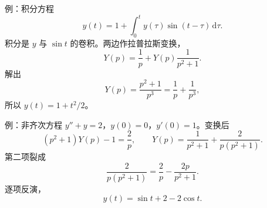 \documentclass[fontset=windows, chinese, 10pt, xcolor=dvipsnames]{beamer}
\begin{document}
\begin{frame}{例：积分方程}
  \begin{equation*}
    y(t)=1+\int_0^t y(\tau)\sin(t-\tau)\,\mathrm{d}\tau.
  \end{equation*}
  积分是 $y$ 与 $\sin t$ 的卷积。两边作拉普拉斯变换，
  \begin{equation*}
    Y(p)=\frac{1}{p}+Y(p)\frac{1}{p^2+1}.
  \end{equation*}
  解出
  \begin{equation*}
    Y(p)=\frac{p^2+1}{p^3}=\frac{1}{p}+\frac{1}{p^3},
  \end{equation*}
  所以 $y(t)=1+t^2/2$。
\end{frame}


\begin{frame}{例：非齐次方程}
  $y''+y=2$，$y(0)=0$，$y'(0)=1$。变换后
  \begin{equation*}
    (p^2+1)Y(p)-1=\frac{2}{p},
    \qquad
    Y(p)=\frac{1}{p^2+1}+\frac{2}{p(p^2+1)}.
  \end{equation*}
  第二项裂成
  \begin{equation*}
    \frac{2}{p(p^2+1)}=\frac{2}{p}-\frac{2p}{p^2+1}.
  \end{equation*}
  逐项反演，
  \begin{equation*}
    y(t)=\sin t+2-2\cos t.
  \end{equation*}
\end{frame}

\end{document}
